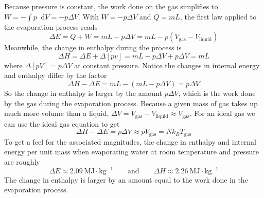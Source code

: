 \documentclass[11pt, a4paper]{article}
\newcommand{\eqtext}[1]{\qquad \text{#1} \qquad}
\newcommand{\diff}{\mathop{}\!\mathrm{d}} %
\begin{document}
\begin{itemize}
	Because pressure is constant, the work done on the gas simplifies to $ W = - \int p\diff V = - p \Delta V $. With $  W = - p \Delta V $ and $ Q = mL $, the first law applied to the evaporation process reads
	\begin{equation*}
		\Delta E = Q + W = mL - p \Delta V = mL - p(V_{\text{gas}} - V_{\text{liquid}})
	\end{equation*}
	Meanwhile, the change in enthalpy during the process is 
	\begin{equation*}
		\Delta H = \Delta E + \Delta[pv] = mL - p \Delta V + p \Delta V = mL
	\end{equation*}
	where $ \Delta[pV] = p \Delta V$ at constant pressure. Notice the changes in internal energy and enthalpy differ by the factor
	\begin{equation*}
		\Delta H - \Delta E = mL - (mL - p \Delta V) = p \Delta V
	\end{equation*}
	So the change in enthalpy is larger by the amount $ p \Delta V $, which is the work done by the gas during the evaporation process. Because a given mass of gas takes up much more volume than a liquid, $ \Delta V = V_{\text{gas}} - V_{\text{liquid}} \approx V_{\text{gas}} $. For an ideal gas we can use the ideal gas equation to get
	\begin{equation*}
		\Delta H - \Delta E = p \Delta V \approx p V_{\text{gas}} = Nk_{B}T_{\text{gas}}
	\end{equation*}
	To get a feel for the associated magnitudes, the change in enthalpy and internal energy per unit mass when evaporating water at room temperature and pressure are roughly
	\begin{equation*}
		\Delta E \approx \SI{2.09}{\mega \joule \cdot \kilogram^{-1}} \eqtext{and} \Delta H \approx \SI{2.26}{\mega \joule \cdot \kilogram^{-1}}
	\end{equation*}
	The change in enthalpy is larger by an amount equal to the work done in the evaporation process.
\end{itemize}
\end{document}
